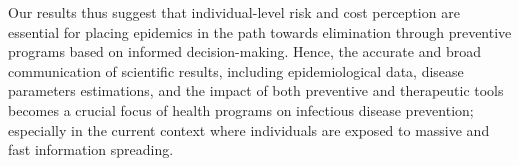Our results thus suggest that individual-level risk and cost perception are essential for placing epidemics in the path towards elimination through preventive programs based on informed decision-making. Hence, the accurate and broad communication of scientific results, including epidemiological data, disease parameters estimations, and the impact of both preventive and therapeutic tools becomes a crucial focus of health programs on infectious disease prevention; especially in the current context where individuals are exposed to massive and fast information spreading. 